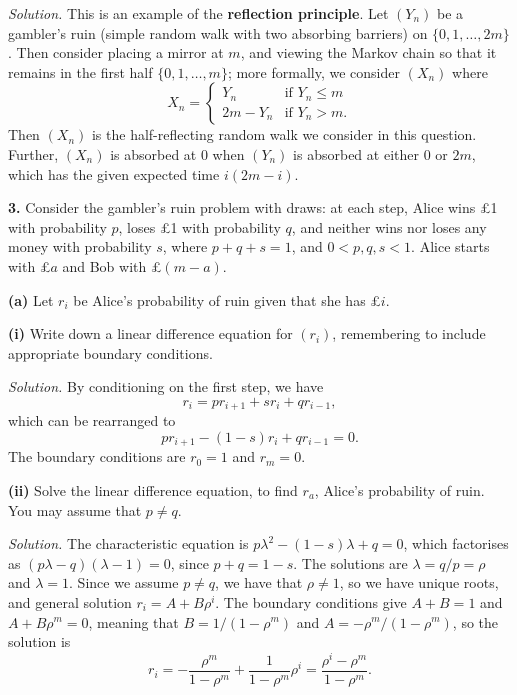\documentclass[
  a4paper,
]{article}
\theoremstyle{definition}
\theoremstyle{definition}
\theoremstyle{definition}
\theoremstyle{remark}
\begin{document}
\begin{myanswers}
\emph{Solution.} This is an example of the \textbf{reflection principle}. Let \((Y_n)\) be a gambler's ruin (simple random walk with two absorbing barriers) on \(\{0,1,\dots, 2m\}\). Then consider placing a mirror at \(m\), and viewing the Markov chain so that it remains in the first half \(\{0,1,\dots,m\}\); more formally, we consider \((X_n)\) where
\[ X_n = \begin{cases} Y_n & \text{if $Y_n \leq m$} \\
                      2m - Y_n & \text{if $Y_n > m$.} \end{cases}   \]
Then \((X_n)\) is the half-reflecting random walk we consider in this question. Further, \((X_n)\) is absorbed at \(0\) when \((Y_n)\) is absorbed at either \(0\) or \(2m\), which has the given expected time \(i(2m-i)\).

\end{myanswers}

\textbf{3.} Consider the gambler's ruin problem with draws: at each step, Alice wins £1 with probability \(p\), loses £1 with probability \(q\), and neither wins nor loses any money with probability \(s\), where \(p + q +s = 1\), and \(0 < p,q,s<1\). Alice starts with £\(a\) and Bob with £\((m-a)\).

\textbf{(a)} Let \(r_i\) be Alice's probability of ruin given that she has £\(i\).

\textbf{(i)} Write down a linear difference equation for \((r_i)\), remembering to include appropriate boundary conditions.

\begin{myanswers}
\emph{Solution.} By conditioning on the first step, we have
\[ r_i = pr_{i+1} + sr_i + qr_{i-1} , \]
which can be rearranged to
\[ pr_{i+1} - (1-s)r_i + qr_{i-1} = 0 . \]
The boundary conditions are \(r_0 = 1\) and \(r_m = 0\).

\end{myanswers}

\textbf{(ii)} Solve the linear difference equation, to find \(r_a\), Alice's probability of ruin. You may assume that \(p \neq q\).

\begin{myanswers}
\emph{Solution.} The characteristic equation is \(p\lambda^2 - (1-s)\lambda + q = 0\), which factorises as \((p\lambda - q)(\lambda - 1) = 0\), since \(p + q = 1-s\). The solutions are \(\lambda = q/p = \rho\) and \(\lambda = 1\). Since we assume \(p \neq q\), we have that \(\rho \neq 1\), so we have unique roots, and general solution
\(r_i = A + B \rho^i\). The boundary conditions give \(A + B = 1\) and \(A + B\rho^m = 0\), meaning that \(B = 1/(1-\rho^m)\) and \(A = -\rho^m/(1-\rho^m)\), so the solution is
\[ r_i = -\frac{\rho^m}{1-\rho^m} + \frac{1}{1-\rho^m}\rho^i = \frac{\rho^i - \rho^m}{1-\rho^m}.   \]

\end{myanswers}
\end{document}
